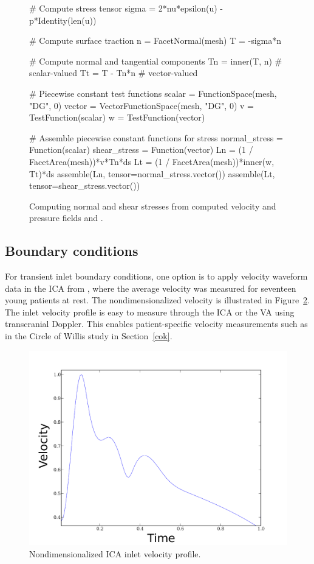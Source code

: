 \begin{figure}
\bwfig
\begin{python}
# Compute stress tensor
sigma = 2*nu*epsilon(u) - p*Identity(len(u))

# Compute surface traction
n = FacetNormal(mesh)
T = -sigma*n

# Compute normal and tangential components
Tn = inner(T, n) # scalar-valued
Tt = T - Tn*n    # vector-valued

# Piecewise constant test functions
scalar = FunctionSpace(mesh, "DG", 0)
vector = VectorFunctionSpace(mesh, "DG", 0)
v = TestFunction(scalar)
w = TestFunction(vector)

# Assemble piecewise constant functions for stress
normal_stress = Function(scalar)
shear_stress = Function(vector)
Ln = (1 / FacetArea(mesh))*v*Tn*ds
Lt = (1 / FacetArea(mesh))*inner(w, Tt)*ds
assemble(Ln, tensor=normal_stress.vector())
assemble(Lt, tensor=shear_stress.vector())
\end{python}
  \caption{Computing normal and shear stresses from computed
    velocity and pressure fields  and .}
\label{fig:kvs-2:stress_code}\end{figure}

\subsection{Boundary conditions} \label{resistance_bcs}

For transient inlet boundary conditions, one option is to apply
velocity waveform data in the ICA from \citet{FordAlperinLeeEtAl2005},
where the average velocity was measured for seventeen young patients
at rest. The nondimensionalized velocity is illustrated in
Figure~\ref{fig:kvs-2:ford}. The inlet velocity profile is easy to
measure through the ICA or the VA using transcranial Doppler. This
enables patient-specific velocity measurements such as in the Circle of Willis
study in Section~\ref{cok}.

\begin{figure}
\bwfig
  \centering
  \includegraphics[width=\largefig]{chapters/kvs-2/pdf/systolic.pdf}
   \caption{Nondimensionalized ICA inlet velocity profile.}
\label{fig:kvs-2:ford}
\end{figure}

